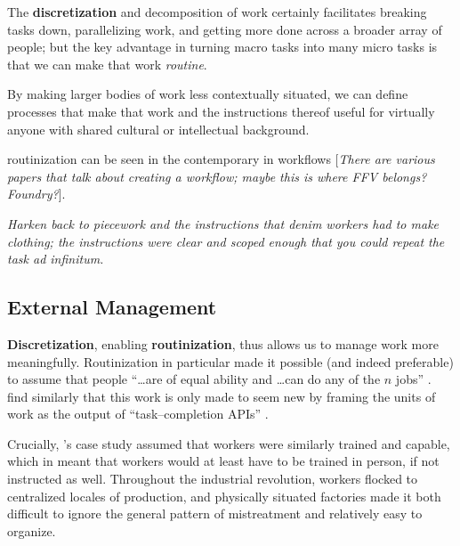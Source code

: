 \documentclass{sigchi}
\begin{document}
The \textbf{discretization} and decomposition of work certainly facilitates
breaking tasks down,
parallelizing work,
and getting more done across a broader array of people;
but the key advantage in turning macro tasks 
into many micro tasks is that we can make that work \textit{routine}.

By making larger bodies of work less contextually situated,
we can define processes that make that work
and the instructions thereof
useful for virtually anyone with shared cultural or intellectual background.

routinization can be seen in the contemporary in workflows
\cite{foundry,bernstein2015soylent}
[\textit{There are various papers that talk about creating a workflow;
maybe this is where FFV belongs? Foundry?}].

\textit{Harken back to piecework
and the instructions that denim workers had to make clothing;
the instructions were clear and scoped enough that you could repeat the task ad infinitum.}


\subsection{External Management}
\textbf{Discretization}, enabling \textbf{routinization}, thus allows us to
manage work more meaningfully.
Routinization in particular made it possible
(and indeed preferable) to assume that people
``\dots are of equal ability and \dots can do any of the $n$ jobs''
\cite{hu1961parallel}.
\citeauthor{storiesIraniSilberman}
find similarly that
this work is only made to seem new by framing the units of work as the output of ``task--completion APIs''
\cite{storiesIraniSilberman}.

Crucially,
\citeauthor{hu1961parallel}'s case study assumed that workers were similarly trained and capable,
which in \citeyear{hu1961parallel}
meant that workers would at least have to be trained in person, if not instructed as well.
Throughout the industrial revolution, workers flocked to centralized locales of production,
and physically situated factories made it both
difficult to ignore the general pattern of mistreatment and
relatively easy to organize.
\end{document}
